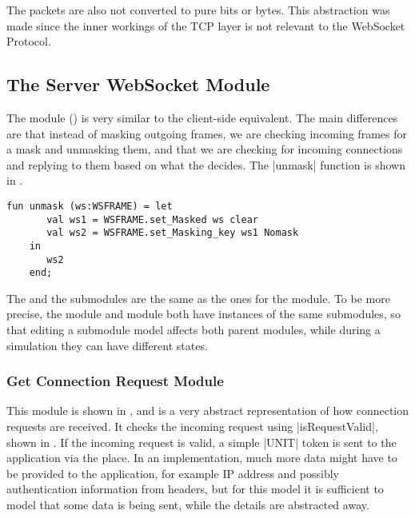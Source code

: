 	The packets are also not converted to pure bits or bytes. This abstraction was
	made since the inner workings of the TCP layer is not relevant to the WebSocket
	Protocol.

\subsection{The Server WebSocket Module}
	
	
	The  module () is very similar
	to the client-side equivalent.
	The main differences are that instead of masking outgoing frames, we are checking
	incoming frames for a mask and unmasking them, and that we are checking for
	incoming connections and replying to them based on what the  decides. The |unmask| function is shown in .
	 
	\begin{lstlisting}[label=lst:unmask,caption=unmask,gobble=1,float]
	fun unmask (ws:WSFRAME) = let
	   val ws1 = WSFRAME.set_Masked ws clear
	   val ws2 = WSFRAME.set_Masking_key ws1 Nomask
	in 
	   ws2
	end;
	\end{lstlisting}
		
	The  and the
	 submodules are the same as the ones for the
	 module. To be more precise, the  module and  module both have instances of
	the same submodules, so that editing a submodule model affects both parent
	modules, while during a simulation they can have different states.
	
	\subsubsection{Get Connection Request Module}
		
		
		This module is shown in , and is a very abstract
		representation of how connection requests are received. It checks the incoming request using
		|isRequestValid|, shown in . If the incoming request
		is valid, a simple |UNIT| token is sent to the application via the
		 place. In an implementation, much more data might
		have to be provided to the application, for example IP address and possibly
		authentication information from headers, but for this model it is sufficient
		to model that some data is being sent, while the details are abstracted away.

